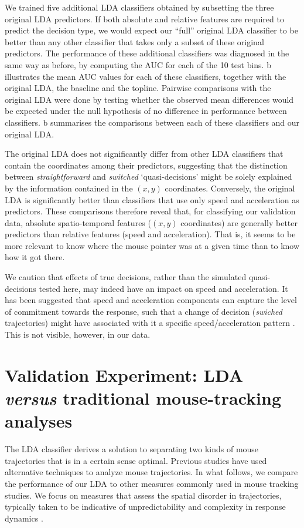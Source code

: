 \documentclass[draft]{article}
\begin{document}
We trained five additional LDA classifiers obtained by subsetting the three original LDA predictors. If both absolute and relative features are required to predict the decision type, we would expect our ``full'' original LDA classifier to be better than any other classifier that takes only a subset of these original predictors. 
The performance of these additional classifiers was diagnosed in the same way as before, by computing the AUC for each of the 10 test bins. b illustrates the mean AUC values for each of these classifiers, together with the original LDA, the baseline and the topline. 
Pairwise comparisons with the original LDA were done by testing whether the observed mean differences would be expected under the null hypothesis of no difference in performance between classifiers. b summarises the comparisons between each of these classifiers and our original LDA. 	

The original LDA does not significantly differ from other LDA classifiers that contain the coordinates among their predictors, suggesting that the distinction between \emph{straightforward} and \emph{switched} `quasi-decisions' might be solely explained by the information contained in the $(x,y)$ coordinates. 
Conversely, the original LDA is significantly better than classifiers that use only speed and acceleration as predictors. These comparisons therefore reveal that, for classifying our validation data, absolute spatio-temporal features ($(x,y)$ coordinates) are generally better predictors than relative features (speed and acceleration). That is, it seems to be more relevant to know where the mouse pointer was at a given time than to know how it got there. 

We caution that effects of true decisions, rather than the simulated quasi-decisions tested here, may indeed have an impact on speed and acceleration. It has been suggested that speed and acceleration components can capture the level of commitment towards the response, such that a change of decision (\textit{swiched} trajectories) might have associated with it a specific speed/acceleration pattern \citep{Hehman2014}. This is not visible, however, in our data.


\section{Validation Experiment: LDA \emph{versus} traditional mouse-tracking analyses}
\label{section:other-mt}
The LDA classifier derives a solution to separating two kinds of mouse trajectories that is in a certain sense optimal. Previous studies have used alternative techniques to analyze mouse trajectories. In what follows, we  compare the performance of our LDA to other measures commonly used in mouse tracking studies. We focus on measures that assess the spatial disorder in trajectories, typically taken to be indicative of unpredictability and complexity in response dynamics \citep{Hehman2014}.
\end{document}
